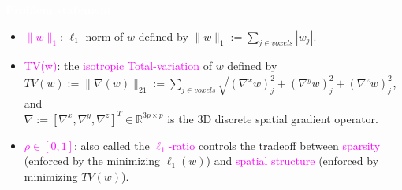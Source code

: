 \documentclass[french]{STIC_poster}
\begin{document}
\begin{frame}[t]
\begin{columns}[t]
\begin{column}{.48\linewidth}
\begin{abox}{\textbf{\textcolor{white}{Problem statement}}}
\begin{itemize}
\begin{itemize}
                                        \item \textcolor{magenta}{$\|w\|_1$}: $\ell_1$-norm of $w$ defined by $\|w\|_1 := \sum_{j \in voxels}{|w_j|}$.
                                      \item \textcolor{magenta}{TV(w)}: the \textcolor{magenta}{isotropic Total-variation} of $w$ defined by\\
                                        $TV(w):=\|\nabla(w)\|_{21} :=\sum_{j \in voxels}{\sqrt{(\nabla^xw)_j^2+(\nabla^yw)_j^2+(\nabla^zw)_j^2}}$,
                                        and \\ $\nabla := [\nabla^x,\nabla^y,\nabla^z]^T \in \mathbb{R}^{3p \times p}$
                                        is the 3D discrete spatial gradient operator.
                                      \item \textcolor{magenta}{$\rho \in [0, 1]$}: also called the \textcolor{magenta}{$\ell_1$-ratio} controls the tradeoff between \textcolor{magenta}{sparsity}
                                        (enforced by the minimizing $\ell_1(w)$) and
                                        \textcolor{magenta}{spatial structure} (enforced by minimizing $TV(w)$).


\end{itemize}
\end{itemize}
\end{abox}
\end{column}
\end{columns}
\end{frame}
\end{document}
